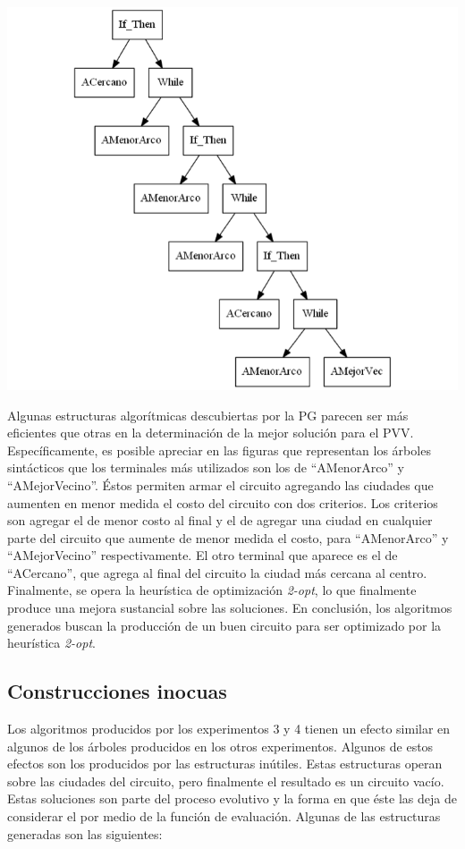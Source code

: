 \begingroup
    \centering
    \includegraphics[width=14cm]{images/cap6/AITSP2.png}
    \label{fig:AITSP2}
\endgroup

Algunas estructuras algorítmicas descubiertas por la PG parecen ser más eficientes que otras en la determinación de la mejor solución para el PVV. Específicamente, es posible apreciar en las figuras que representan los árboles sintácticos que los terminales más utilizados son los de “AMenorArco” y “AMejorVecino”. Éstos permiten armar el circuito agregando las ciudades que aumenten en menor medida el costo del circuito con dos criterios. Los criterios son agregar el de menor costo al final y el de agregar una ciudad en cualquier parte del circuito que aumente de menor medida el costo, para “AMenorArco” y “AMejorVecino” respectivamente. El otro terminal que aparece es el de “ACercano”, que agrega al final del circuito la ciudad más cercana al centro. Finalmente, se opera la heurística de optimización \textit{2-opt}, lo que finalmente produce una mejora sustancial sobre las soluciones. En conclusión, los algoritmos generados buscan la producción de un buen circuito para ser optimizado por la heurística \textit{2-opt}.

\subsection{Construcciones inocuas}

Los algoritmos producidos por los experimentos 3 y 4 tienen un efecto similar en algunos de los árboles producidos en los otros experimentos. Algunos de estos efectos son los producidos por las estructuras inútiles. Estas estructuras operan sobre las ciudades del circuito, pero finalmente el resultado es un circuito vacío. Estas soluciones son parte del proceso evolutivo y la forma en que éste las deja de considerar el por medio de la función de evaluación. Algunas de las estructuras generadas son las siguientes:

